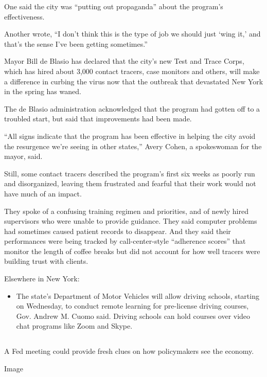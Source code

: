 One said the city was ``putting out propaganda'' about the program's
effectiveness.

Another wrote, ``I don't think this is the type of job we should just
`wing it,' and that's the sense I've been getting sometimes.''

Mayor Bill de Blasio has declared that the city's new Test and Trace
Corps, which has hired about 3,000 contact tracers, case monitors and
others, will make a difference in curbing the virus now that the
outbreak that devastated New York in the spring has waned.

The de Blasio administration acknowledged that the program had gotten
off to a troubled start, but said that improvements had been made.

``All signs indicate that the program has been effective in helping the
city avoid the resurgence we're seeing in other states,'' Avery Cohen, a
spokeswoman for the mayor, said.

Still, some contact tracers described the program's first six weeks as
poorly run and disorganized, leaving them frustrated and fearful that
their work would not have much of an impact.

They spoke of a confusing training regimen and priorities, and of newly
hired supervisors who were unable to provide guidance. They said
computer problems had sometimes caused patient records to disappear. And
they said their performances were being tracked by call-center-style
``adherence scores'' that monitor the length of coffee breaks but did
not account for how well tracers were building trust with clients.

Elsewhere in New York:

\begin{itemize}
\tightlist
\item
  The state's Department of Motor Vehicles will allow driving schools,
  starting on Wednesday, to conduct remote learning for pre-license
  driving courses, Gov. Andrew M. Cuomo said. Driving schools can hold
  courses over video chat programs like Zoom and Skype.
\end{itemize}

\hypertarget{-10}{%
\subsection{}\label{-10}}

A Fed meeting could provide fresh clues on how policymakers see the
economy.

Image

